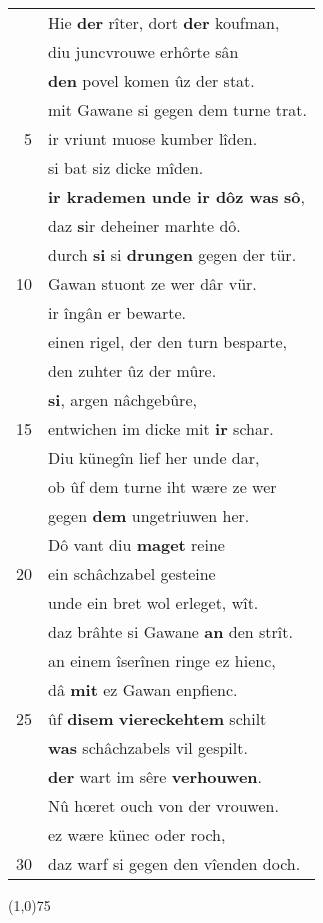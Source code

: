 \documentclass[8pt,a4paper,notitlepage]{article}
\begin{document}
\begin{table}[ht]
\begin{minipage}[t]{0.5\linewidth}
\begin{tabular}{rl}
 & Hie \textbf{der} rîter, dort \textbf{der} koufman,\\ 
 & diu juncvrouwe erhôrte sân\\ 
 & \textbf{den} povel komen ûz der stat.\\ 
 & mit Gawane si gegen dem turne trat.\\ 
5 & ir vriunt muose kumber lîden.\\ 
 & si bat siz dicke mîden.\\ 
 & \textbf{ir krademen unde ir dôz was} \textbf{sô},\\ 
 & daz \textbf{s}ir deheiner marhte dô.\\ 
 & durch \textbf{si} si \textbf{drungen} gegen der tür.\\ 
10 & Gawan stuont ze wer dâr vür.\\ 
 & ir îngân er bewarte.\\ 
 & einen rigel, der den turn besparte,\\ 
 & den zuhter ûz der mûre.\\ 
 & \textbf{si}, argen nâchgebûre,\\ 
15 & entwichen im dicke mit \textbf{ir} schar.\\ 
 & Diu künegîn lief her unde dar,\\ 
 & ob ûf dem turne iht wære ze wer\\ 
 & gegen \textbf{dem} ungetriuwen her.\\ 
 & Dô vant diu \textbf{maget} reine\\ 
20 & ein schâchzabel gesteine\\ 
 & unde ein bret wol erleget, wît.\\ 
 & daz brâhte si Gawane \textbf{an} den strît.\\ 
 & an einem îserînen ringe ez hienc,\\ 
 & dâ \textbf{mit} ez Gawan enpfienc.\\ 
25 & ûf \textbf{disem} \textbf{viereckehtem} schilt\\ 
 & \textbf{was} schâchzabels vil gespilt.\\ 
 & \textbf{der} wart im sêre \textbf{verhouwen}.\\ 
 & Nû hœret ouch von der vrouwen.\\ 
 & ez wære künec oder roch,\\ 
30 & daz warf si gegen den vîenden doch.\\ 
\end{tabular}
\scriptsize
\line(1,0){75} \newline

\end{minipage}
\end{table}
\end{document}
